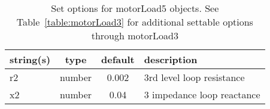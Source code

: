 \begin{table}[ht]
\centering
\begin{tabular}{p{5cm} c c p{7cm}}
\hline
string(s) & type & default & description \\
\hline
r2 & number & 0.002 & 3rd level loop resistance\\
x2 & number & 0.04 & 3 impedance loop reactance\\
\hline
\end{tabular}
\caption{Set options for motorLoad5 objects. See Table~\ref{table:motorLoad3} for additional settable options through motorLoad3}
\label{table:motorLoad5}
\end{table}
